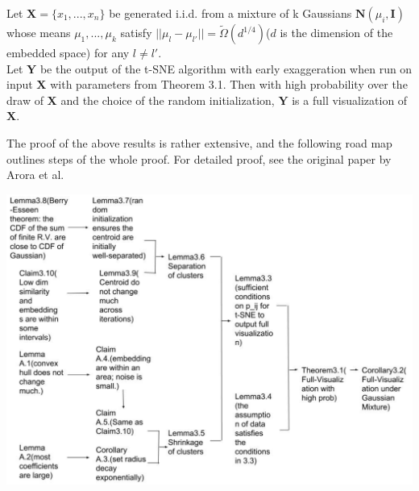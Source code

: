 \begin{corollary}
Let $\mathbf{X}=\{ x_1,...,x_n \} $ be generated i.i.d. from a mixture
of k Gaussians $\mathbf{N}(\mu_i, \mathbf{I})$ whose means
$\mu_1,...,\mu_k$ satisfy $\vert \vert \mu_l - \mu_{l'} \vert \vert =
\tilde{\Omega} (d^{1/4})$($d$ is the dimension of the embedded space)
for any $l\neq l'$.\\ 
Let $\mathbf{Y}$ be the output of the t-SNE algorithm with early
exaggeration when run on input $\mathbf{X}$ with parameters from
Theorem 3.1. Then with high probability over the draw of $\mathbf{X}$
and the choice of the random initialization, $\mathbf{Y}$ is a full
visualization of $\mathbf{X}$. 
\end{corollary}

The proof of the above results is rather extensive, and the following
road map outlines steps of the whole proof. For detailed proof, see
the original paper by Arora et al. 

\begin{center}
    \includegraphics[scale=0.5]{chapter_7/files/fig7.png}
\end{center}
